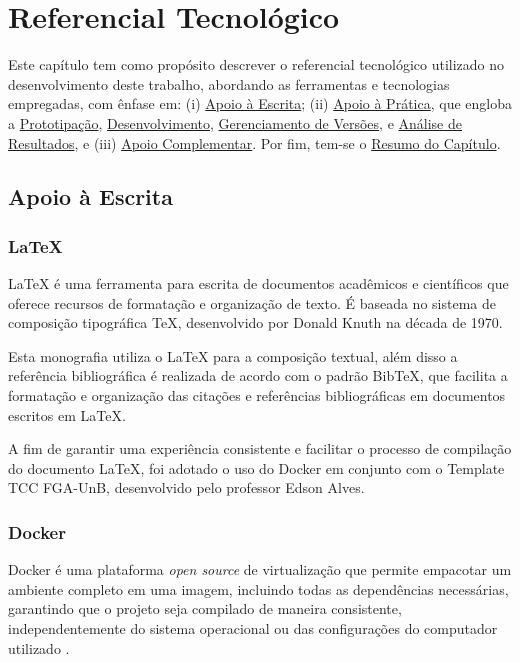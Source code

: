 \chapter[Referencial Tecnológico]{Referencial Tecnológico}
Este capítulo tem como propósito descrever o referencial tecnológico utilizado no desenvolvimento
deste trabalho, abordando as ferramentas e tecnologias empregadas, com ênfase em: (i) \hyperref[sec:Apoio à Escrita]{Apoio à Escrita}; 
(ii) \hyperref[sec:Apoio à Prática]{Apoio à Prática}, que engloba a \hyperref[sec:Prototipação]{Prototipação}, \hyperref[sec:Desenvolvimento]{Desenvolvimento}, \hyperref[sec:Gerenciamento de Versões]{Gerenciamento de Versões}, 
e \hyperref[sec:Análise de Resultados]{Análise de Resultados}, e (iii) \hyperref[sec:Apoio Complementar]{Apoio Complementar}. Por fim, tem-se o \hyperref[sec:Resumo do Capítulo]{Resumo do Capítulo}.

\section{Apoio à Escrita}
\label{sec:Apoio à Escrita}

\subsection{LaTeX}
\label{sec:Latex}
LaTeX \cite{latex} é uma ferramenta para escrita de documentos acadêmicos e científicos que oferece 
recursos de formatação e organização de texto. É baseada no sistema de composição tipográfica 
TeX, desenvolvido por Donald Knuth na década de 1970.

Esta monografia utiliza o LaTeX para a composição textual, além disso a referência bibliográfica 
é realizada de acordo com o padrão BibTeX, que facilita a formatação e organização das citações e 
referências bibliográficas em documentos escritos em LaTeX.

A fim de garantir uma experiência consistente e facilitar o processo de compilação do documento LaTeX, foi 
adotado o uso do Docker em conjunto com o Template TCC FGA-UnB, desenvolvido pelo professor 
Edson Alves. 

\subsection{Docker}
\label{sec:Docker}
Docker é uma plataforma \textit{open source} de virtualização que permite empacotar um ambiente completo em 
uma imagem, incluindo todas as dependências necessárias, garantindo que o projeto seja 
compilado de maneira consistente, independentemente do sistema operacional ou das configurações do computador   
utilizado \cite{docker}.

